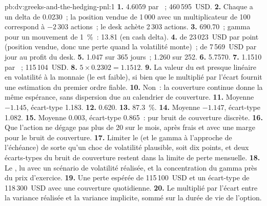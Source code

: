 \begin{solution}{pb:dv:greeks-and-the-hedging-pnl:1}
\textbf{1.} 4.6059 par ~; 460\,595~USD.
\textbf{2.} Chaque  a un delta de 0.0230~; la position vendue de 1\,000 avec un multiplicateur de 100 correspond à $-2\,303$
actions~; le desk achète 2\,303 actions.
\textbf{3.}  690.70~; gamma pour un mouvement de 1~\%~: 13.81 (en cash delta).
\textbf{4.}  de 23\,023~USD par point (position vendue, donc une perte quand la volatilité monte)~; 
de 7\,569~USD par jour au profit du desk.
\textbf{5.} 1.047 sur 365 jours~; 1.260 sur 252.
\textbf{6.} 5.7570.
\textbf{7.} 1.1510 par ~; 115\,104~USD.
\textbf{8.} $5\times0.2302=1.1512$.
\textbf{9.} La valeur du  est presque linéaire en volatilité à la monnaie (le  est
faible), si bien que le  multiplié par l'écart fournit une estimation du premier ordre fiable.
\textbf{10.} Non~: la couverture continue donne la même espérance, sans dispersion
due au calendrier de couverture.
\textbf{11.} Moyenne $-1.145$, écart-type 1.183.
\textbf{12.} 0.620.
\textbf{13.} 87.3~\%.
\textbf{14.} Moyenne $-1.147$, écart-type 1.082.
\textbf{15.} Moyenne 0.003, écart-type 0.865~: pur bruit de couverture discrète.
\textbf{16.} Que l'action ne dégage pas plus de 20 sur le mois, après frais et
avec une marge pour le bruit de couverture.
\textbf{17.} Limiter le  (et le gamma à l'approche de l'échéance) de sorte qu'un choc de volatilité
plausible, soit dix points, et deux écarts-types du bruit de couverture restent dans la
limite de perte mensuelle.
\textbf{18.} Le , lu avec un scénario de volatilité réalisée, et la
concentration du gamma près du prix d'exercice.
\textbf{19.} Une perte espérée de 115\,100~USD et un écart-type de 118\,300~USD
avec une couverture quotidienne.
\textbf{20.} Le  multiplié par l'écart entre la variance réalisée et la variance implicite,
sommé sur la durée de vie de l'option.
\end{solution}

